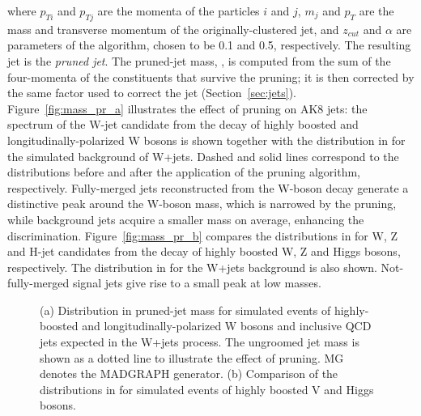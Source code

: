 \noindent where $p_{Ti}$ and $p_{Tj}$ are the momenta of the particles $i$ and $j$, $m_j$ and $p_T$ are the mass and transverse momentum of the originally-clustered jet, and $z_{cut}$ and $\alpha$ are parameters of the algorithm, chosen to be 0.1 and 0.5, respectively. 
The resulting jet is the \emph{pruned jet}. The pruned-jet mass, \mJ, is computed from the sum of the four-momenta of the constituents that survive the pruning; it is then corrected by the same factor used to correct the jet \pt (Section~\ref{sec:jets}).
Figure~\ref{fig:mass_pr_a} illustrates the effect of pruning on AK8 jets: the \mJ spectrum of the W-jet candidate from the decay of highly boosted and longitudinally-polarized W bosons is shown together with the distribution in \mJ for the simulated background of W+jets. Dashed and solid lines correspond to the distributions before and after the application of the pruning algorithm, respectively. Fully-merged jets reconstructed from the W-boson decay generate a distinctive peak around the W-boson mass, which is narrowed by the pruning, while background jets acquire a smaller mass on average, enhancing the discrimination. Figure~\ref{fig:mass_pr_b} compares the distributions in \mJ for W, Z and H-jet candidates from the decay of highly boosted W, Z and Higgs bosons, respectively. The distribution in \mJ for the W+jets background is also shown. Not-fully-merged signal jets give rise to a small peak at low masses. 

\begin{figure}[!htb]
\centering     %
{}
\caption{(a) Distribution in pruned-jet mass \mJ for simulated events of highly-boosted and longitudinally-polarized W bosons and inclusive QCD jets expected in the W+jets process. The ungroomed jet mass is shown as a dotted line to illustrate the effect of pruning. MG denotes the MADGRAPH generator. (b) Comparison of the distributions in \mJ for simulated events of highly boosted V and Higgs bosons.}
\label{fig:mass_pr}
\end{figure}
 
